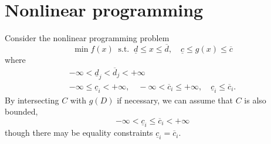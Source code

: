 \documentclass[11pt,a4paper]{article}
\newcommand{\cl}{{\underline{c}}}
\newcommand{\dl}{{\underline{d}}}
\newcommand{\cu}{{\overline{c}}}
\newcommand{\du}{{\overline{d}}}
\newcommand{\x}{x}
\begin{document}
\section*{Nonlinear programming}

Consider the nonlinear programming problem
\[ \min f(x) \ \text{ s.t. } \ \dl\leq\x\leq\du, \quad \cl\leq g(x)\leq\cu \]
where
\[ \begin{gathered}
      -\infty < \dl_j < \du_j < +\infty \\
      -\infty \leq \cl_i < +\infty, \quad -\infty<\cu_i\leq+\infty, \quad \cl_i\leq \cu_i.
   \end{gathered} \]
By intersecting $C$ with $g(D)$ if necessary, we can assume that $C$ is also bounded,
\[ -\infty < \cl_i \leq \cu_i < +\infty \]
though there may be equality constraints $\cl_i=\cu_i$.
\end{document}
